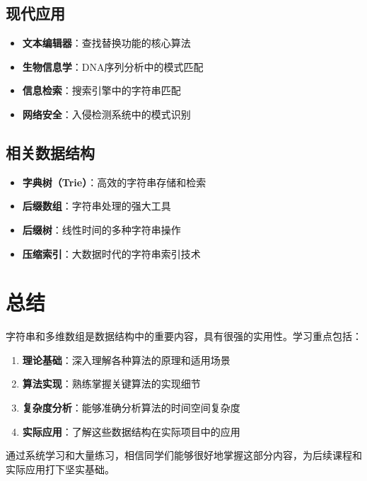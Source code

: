 \documentclass[12pt,a4paper]{amsart}
\begin{document}
\subsection{现代应用}
\begin{itemize}
\item \textbf{文本编辑器}：查找替换功能的核心算法
\item \textbf{生物信息学}：DNA序列分析中的模式匹配
\item \textbf{信息检索}：搜索引擎中的字符串匹配
\item \textbf{网络安全}：入侵检测系统中的模式识别
\end{itemize}

\subsection{相关数据结构}
\begin{itemize}
\item \textbf{字典树（Trie）}：高效的字符串存储和检索
\item \textbf{后缀数组}：字符串处理的强大工具
\item \textbf{后缀树}：线性时间的多种字符串操作
\item \textbf{压缩索引}：大数据时代的字符串索引技术
\end{itemize}

\section{总结}

字符串和多维数组是数据结构中的重要内容，具有很强的实用性。学习重点包括：

\begin{enumerate}
\item \textbf{理论基础}：深入理解各种算法的原理和适用场景
\item \textbf{算法实现}：熟练掌握关键算法的实现细节
\item \textbf{复杂度分析}：能够准确分析算法的时间空间复杂度
\item \textbf{实际应用}：了解这些数据结构在实际项目中的应用
\end{enumerate}

通过系统学习和大量练习，相信同学们能够很好地掌握这部分内容，为后续课程和实际应用打下坚实基础。
\end{document}
